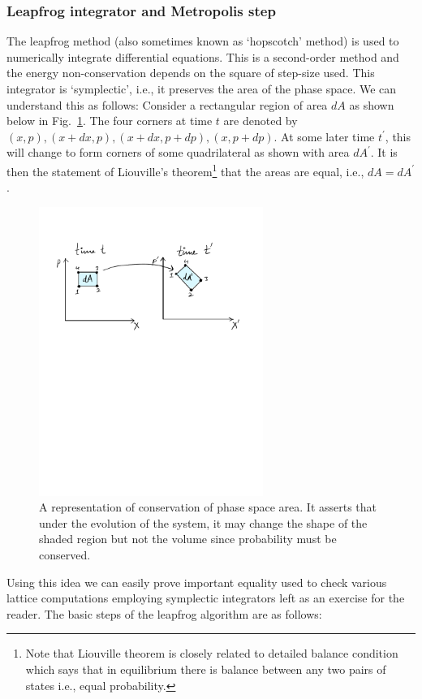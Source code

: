 \documentclass[11pt]{article}
\begin{document}
\subsubsection{Leapfrog integrator and Metropolis step}
The leapfrog method (also sometimes known as `hopscotch' method) 
is used to numerically integrate differential equations. This is a second-order 
method and the energy non-conservation depends on the square of step-size used. This integrator is `symplectic', i.e., it preserves the 
area of the phase space. We can understand this as follows: 
Consider a rectangular region of area $dA$ as shown below in Fig.~\ref{fig:PSP1}. The four corners at time $t$ are denoted by $(x, p), (x+dx, p), (x+dx, p+dp),(x, p+dp)$. At some later time $t^{\prime}$, this will change to form corners of some quadrilateral as shown with area $dA^{\prime}$. It is then the statement of Liouville's theorem\footnote{Note that Liouville theorem is closely related to detailed balance condition which says that in equilibrium there is balance between any two pairs of states i.e., equal probability.} that the areas are equal, i.e., $dA = dA^{\prime}$. 
\begin{figure}[htbp] 
	\centering 
	\includegraphics[width=0.65\textwidth]{figs/PSP.pdf}
	\caption{\label{fig:PSP1}A representation of conservation of phase space area. It asserts that under the evolution of the system, it may change the shape of the shaded region but not the volume since probability must be conserved.}
\end{figure}
Using this idea we can easily prove important equality used to check various lattice computations employing symplectic integrators left as an exercise for the reader. The basic steps of the leapfrog algorithm are as follows:
\end{document}
